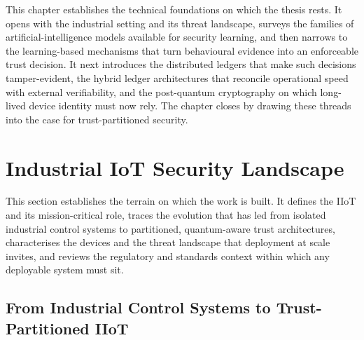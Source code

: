 \Large
\label{Chapter_2}

This chapter establishes the technical foundations on which the thesis rests. It
opens with the industrial setting and its threat landscape, surveys the families
of artificial-intelligence models available for security learning, and then
narrows to the learning-based mechanisms that turn behavioural evidence into an
enforceable trust decision. It next introduces the distributed ledgers that make
such decisions tamper-evident, the hybrid ledger architectures that reconcile
operational speed with external verifiability, and the post-quantum cryptography
on which long-lived device identity must now rely. The chapter closes by drawing
these threads into the case for trust-partitioned security.

\section{Industrial IoT Security Landscape}
\label{sec:bg-landscape}

This section establishes the terrain on which the work is built. It defines the
IIoT and its mission-critical role, traces the evolution
that has led from isolated industrial control systems to partitioned,
quantum-aware trust architectures, characterises the devices and the threat
landscape that deployment at scale invites, and reviews the regulatory and
standards context within which any deployable system must sit.

\subsection{From Industrial Control Systems to Trust-Partitioned IIoT}
\label{subsec:bg-evolution}

